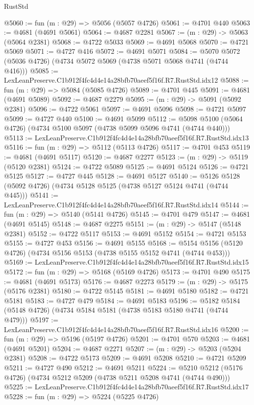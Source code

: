 \begin{lexlean}{RustStd}
\begin{coremodule}
@5060 := fun (m : @29) => @5056 (@5057 @4726)
@5061 := @4701 @440
@5063 := @4681 (@4691 @5061)
@5064 := @4687 @2281
@5067 := (m : @29) -> @5063 (@5064 @2381)
@5068 := @4722 @5033
@5069 := @4691 @5068
@5070 := @4721 @5069
@5071 := @4727 @416
@5072 := @4691 @5071
@5084 := @5070 @5072 (@5036 @4726) (@4734 @5072 @5069 (@4738 @5071 @5068 @4741 (@4744 @416)))
@5085 := LexLeanPreserve.C1b912f4fc4d4e14a28bfb70aeef5f16f.R7.RustStd.idx12
@5088 := fun (m : @29) => @5084 (@5085 @4726)
@5089 := @4701 @445
@5091 := @4681 (@4691 @5089)
@5092 := @4687 @2279
@5095 := (m : @29) -> @5091 (@5092 @2381)
@5096 := @4722 @5061
@5097 := @4691 @5096
@5098 := @4721 @5097
@5099 := @4727 @440
@5100 := @4691 @5099
@5112 := @5098 @5100 (@5064 @4726) (@4734 @5100 @5097 (@4738 @5099 @5096 @4741 (@4744 @440)))
@5113 := LexLeanPreserve.C1b912f4fc4d4e14a28bfb70aeef5f16f.R7.RustStd.idx13
@5116 := fun (m : @29) => @5112 (@5113 @4726)
@5117 := @4701 @453
@5119 := @4681 (@4691 @5117)
@5120 := @4687 @2277
@5123 := (m : @29) -> @5119 (@5120 @2381)
@5124 := @4722 @5089
@5125 := @4691 @5124
@5126 := @4721 @5125
@5127 := @4727 @445
@5128 := @4691 @5127
@5140 := @5126 @5128 (@5092 @4726) (@4734 @5128 @5125 (@4738 @5127 @5124 @4741 (@4744 @445)))
@5141 := LexLeanPreserve.C1b912f4fc4d4e14a28bfb70aeef5f16f.R7.RustStd.idx14
@5144 := fun (m : @29) => @5140 (@5141 @4726)
@5145 := @4701 @479
@5147 := @4681 (@4691 @5145)
@5148 := @4687 @2275
@5151 := (m : @29) -> @5147 (@5148 @2381)
@5152 := @4722 @5117
@5153 := @4691 @5152
@5154 := @4721 @5153
@5155 := @4727 @453
@5156 := @4691 @5155
@5168 := @5154 @5156 (@5120 @4726) (@4734 @5156 @5153 (@4738 @5155 @5152 @4741 (@4744 @453)))
@5169 := LexLeanPreserve.C1b912f4fc4d4e14a28bfb70aeef5f16f.R7.RustStd.idx15
@5172 := fun (m : @29) => @5168 (@5169 @4726)
@5173 := @4701 @490
@5175 := @4681 (@4691 @5173)
@5176 := @4687 @2273
@5179 := (m : @29) -> @5175 (@5176 @2381)
@5180 := @4722 @5145
@5181 := @4691 @5180
@5182 := @4721 @5181
@5183 := @4727 @479
@5184 := @4691 @5183
@5196 := @5182 @5184 (@5148 @4726) (@4734 @5184 @5181 (@4738 @5183 @5180 @4741 (@4744 @479)))
@5197 := LexLeanPreserve.C1b912f4fc4d4e14a28bfb70aeef5f16f.R7.RustStd.idx16
@5200 := fun (m : @29) => @5196 (@5197 @4726)
@5201 := @4701 @570
@5203 := @4681 (@4691 @5201)
@5204 := @4687 @2271
@5207 := (m : @29) -> @5203 (@5204 @2381)
@5208 := @4722 @5173
@5209 := @4691 @5208
@5210 := @4721 @5209
@5211 := @4727 @490
@5212 := @4691 @5211
@5224 := @5210 @5212 (@5176 @4726) (@4734 @5212 @5209 (@4738 @5211 @5208 @4741 (@4744 @490)))
@5225 := LexLeanPreserve.C1b912f4fc4d4e14a28bfb70aeef5f16f.R7.RustStd.idx17
@5228 := fun (m : @29) => @5224 (@5225 @4726)

\end{coremodule}
\end{lexlean}
